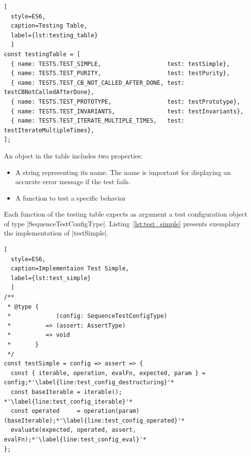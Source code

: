 \begin{lstlisting}[
  style=ES6, 
  caption=Testing Table,
  label={lst:testing_table}
  ]
const testingTable = [
  { name: TESTS.TEST_SIMPLE,                   test: testSimple},
  { name: TESTS.TEST_PURITY,                   test: testPurity},
  { name: TESTS.TEST_CB_NOT_CALLED_AFTER_DONE, test: testCBNotCalledAfterDone},
  { name: TESTS.TEST_PROTOTYPE,                test: testPrototype},
  { name: TESTS.TEST_INVARIANTS,               test: testInvariants},
  { name: TESTS.TEST_ITERATE_MULTIPLE_TIMES,   test: testIterateMultipleTimes},
];
\end{lstlisting}

An object in the table includes two properties:
\begin{itemize}
\item{A string representing its name. The name is important for displaying an accurate error message if the test fails.}
\item{A function to test a specific behavior}
\end{itemize}

Each function of the testing table expects as argument a test configuration
object of type |SequenceTestConfigType|. Listing~\ref{lst:test_simple} presents
exemplary the implementation of |testSimple|.

\begin{lstlisting}[
  style=ES6, 
  caption=Implementaion Test Simple,
  label={lst:test_simple}
  ]
/**
 * @type {
 *             (config: SequenceTestConfigType)
 *          => (assert: AssertType)
 *          => void
 *       }
 */
const testSimple = config => assert => {
  const { iterable, operation, evalFn, expected, param } = config;*'\label{line:test_config_destructuring}'*
  const baseIterable = iterable(); *'\label{line:test_config_iterable}'*
  const operated     = operation(param)(baseIterable);*'\label{line:test_config_operated}'*
  evaluate(expected, operated, assert, evalFn);*'\label{line:test_config_eval}'*
};
\end{lstlisting}


